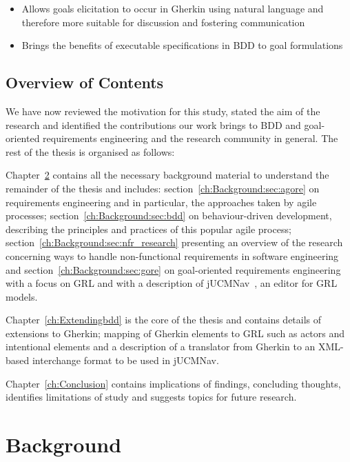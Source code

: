 \documentclass[dissertation]{softeng}
\begin{document}
\begin{center}
\begin{itemize}
\item Allows goals elicitation to occur in Gherkin using natural language and therefore more suitable for discussion and fostering communication
\item Brings the benefits of executable specifications in BDD to goal formulations
\end{itemize}
\end{center}


\section{Overview of Contents}

We have now reviewed the motivation for this study, stated the aim of the research and identified the contributions our work brings to BDD and goal-oriented requirements engineering and the research community in general. The rest of the thesis is organised as follows:

Chapter~\ref{ch:Background} contains all the necessary background material to understand the remainder of the thesis and includes: section~\ref{ch:Background:sec:agore} on requirements engineering and in particular, the approaches taken by agile processes; section~\ref{ch:Background:sec:bdd} on behaviour-driven development, describing the principles and practices of this popular agile process; section~\ref{ch:Background:sec:nfr_research} presenting an overview of the research concerning ways to handle non-functional requirements in software engineering and section~\ref{ch:Background:sec:gore} on goal-oriented requirements engineering with a focus on GRL and with a description of jUCMNav~\citep{Amyot2010}, an editor for GRL models.

Chapter~\ref{ch:Extendingbdd} is the core of the thesis and contains details of extensions to Gherkin; mapping of Gherkin elements to GRL such as actors and intentional elements and a description of a translator from Gherkin to an XML-based interchange format to be used in jUCMNav.

Chapter~\ref{ch:Conclusion} contains implications of findings, concluding thoughts, identifies limitations of study and suggests topics for future research.

\chapter{Background}
\label{ch:Background}
\end{document}
